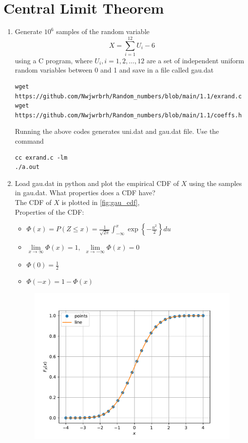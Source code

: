 \documentclass[journal,12pt,twocolumn]{IEEEtran}
\renewcommand\thesection{\arabic{section}}
\begin{document}
\section{Central Limit Theorem}
%
\begin{enumerate}[label=\thesection.\arabic*
,ref=\thesection.\theenumi]
%
\item
Generate $10^6$ samples of the random variable
%
\begin{equation}
X = \sum_{i=1}^{12}U_i -6
\end{equation}
%
using a C program, where $U_i, i = 1,2,\dots, 12$ are  a set of independent uniform random variables between 0 and 1
and save in a file called gau.dat
\\
\solution
\begin{lstlisting}
wget https://github.com/Nwjwrbrh/Random_numbers/blob/main/1.1/exrand.c
wget https://github.com/Nwjwrbrh/Random_numbers/blob/main/1.1/coeffs.h
\end{lstlisting}
Running the above codes generates uni.dat and gau.dat file.
Use the command 
\begin{lstlisting}
cc exrand.c -lm
./a.out
\end{lstlisting}
%
\item
Load gau.dat in python and plot the empirical CDF of $X$ using the samples in gau.dat. What properties does a CDF have?
\\
\solution 
The CDF of $X$ is plotted in \ref{fig:gau_cdf},\\
Properties of the CDF:
\begin{itemize}
\item $\Phi(x)=P(Z \leq x)= \frac{1}{\sqrt{2 \pi}} \int_{-\infty}^{x}\exp\left\{-\frac{u^2}{2}\right\} du$
\item $\lim \limits_{x\rightarrow \infty} \Phi(x)=1, \hspace{5pt} \lim \limits_{x\rightarrow -\infty} \Phi(x)=0$
\item  $\Phi(0)=\frac{1}{2}$
\item  $\Phi(-x)=1-\Phi(x)$
\end{itemize}
\begin{figure}[h]
\centering
\includegraphics[width=\columnwidth]{../2.2/gau_cdf}

\end{figure}
\end{enumerate}
\end{document}
